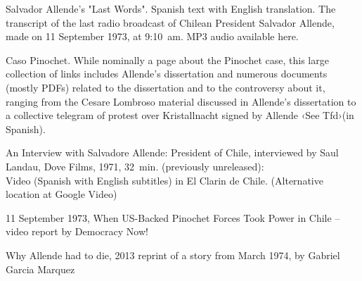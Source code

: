 Salvador Allende's "Last Words". Spanish text with English translation.
The transcript of the last radio broadcast of Chilean President Salvador
Allende, made on 11 September 1973, at 9:10~am. MP3 audio available
here.

Caso Pinochet. While nominally a page about the Pinochet case, this
large collection of links includes Allende's dissertation and numerous
documents (mostly PDFs) related to the dissertation and to the
controversy about it, ranging from the Cesare Lombroso material
discussed in Allende's dissertation to a collective telegram of protest
over Kristallnacht signed by Allende ‹See Tfd›(in Spanish).

An Interview with Salvadore Allende: President of Chile, interviewed by
Saul Landau, Dove Films, 1971, 32~min. (previously unreleased):\\
Video (Spanish with English subtitles) in El Clarin de Chile.
(Alternative location at Google Video)

11 September 1973, When US-Backed Pinochet Forces Took Power in Chile --
video report by Democracy Now!

Why Allende had to die, 2013 reprint of a story from March 1974, by
Gabriel Garcia Marquez
